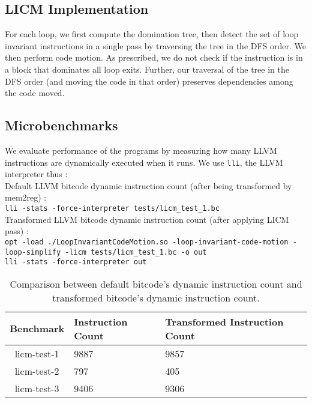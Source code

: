 \subsection{LICM Implementation}

For each loop, we first compute the domination tree, then detect the set of loop invariant instructions in a single pass by traversing the tree in the DFS order. We then perform code motion. As prescribed, we do not check if the instruction is in a block that dominates all loop exits. Further, our traversal of the tree in the DFS order (and moving the code in that order) preserves dependencies among the code moved. 

\subsection{Microbenchmarks}

We evaluate performance of the programs by measuring how many LLVM instructions are dynamically executed when it runs.
We use \texttt{lli}, the LLVM interpreter thus :\\

Default LLVM bitcode dynamic instruction count (after being transformed by mem2reg) :\\

\texttt{lli -stats -force-interpreter tests/licm\_test\_1.bc}\\

Transformed LLVM bitcode dynamic instruction count (after applying LICM pass) :\\

\texttt{opt -load ./LoopInvariantCodeMotion.so -loop-invariant-code-motion -loop-simplify -licm tests/licm\_test\_1.bc -o out}\\

\texttt{lli -stats -force-interpreter out}\\

\begin{table}[!ht]
\centering
\begin{tabular}{c|l|l}
  \toprule
  \textbf{Benchmark} & \textbf{Instruction Count} & \textbf{Transformed Instruction Count} \\
  \midrule
  licm-test-1 & 9887 & 9857 \\ 
  licm-test-2 & 797  & 405 \\
  licm-test-3 & 9406 & 9306 \\ 
  \bottomrule
\end{tabular}
\caption{Comparison between default bitcode's dynamic instruction count and transformed
  bitcode's dynamic instruction count.}
\end{table}  

